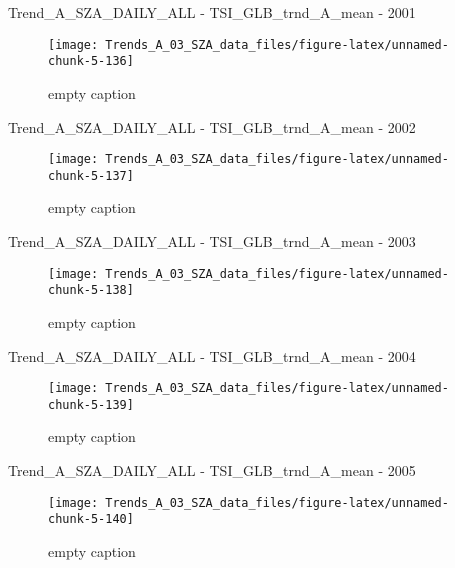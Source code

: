 \documentclass[
  10pt,
  a4paper,oneside]{article}
\begin{document}
Trend\_A\_SZA\_DAILY\_ALL - TSI\_GLB\_trnd\_A\_mean - 2001

\begin{figure}[!ht]

{\centering \texttt{[image: Trends\_A\_03\_SZA\_data\_files/figure-latex/unnamed-chunk-5-136]} 

}

\caption{ empty caption }\label{fig:unnamed-chunk-5-136}
\end{figure}

Trend\_A\_SZA\_DAILY\_ALL - TSI\_GLB\_trnd\_A\_mean - 2002

\begin{figure}[!ht]

{\centering \texttt{[image: Trends\_A\_03\_SZA\_data\_files/figure-latex/unnamed-chunk-5-137]} 

}

\caption{ empty caption }\label{fig:unnamed-chunk-5-137}
\end{figure}

Trend\_A\_SZA\_DAILY\_ALL - TSI\_GLB\_trnd\_A\_mean - 2003

\begin{figure}[!ht]

{\centering \texttt{[image: Trends\_A\_03\_SZA\_data\_files/figure-latex/unnamed-chunk-5-138]} 

}

\caption{ empty caption }\label{fig:unnamed-chunk-5-138}
\end{figure}

Trend\_A\_SZA\_DAILY\_ALL - TSI\_GLB\_trnd\_A\_mean - 2004

\begin{figure}[!ht]

{\centering \texttt{[image: Trends\_A\_03\_SZA\_data\_files/figure-latex/unnamed-chunk-5-139]} 

}

\caption{ empty caption }\label{fig:unnamed-chunk-5-139}
\end{figure}

Trend\_A\_SZA\_DAILY\_ALL - TSI\_GLB\_trnd\_A\_mean - 2005

\begin{figure}[!ht]

{\centering \texttt{[image: Trends\_A\_03\_SZA\_data\_files/figure-latex/unnamed-chunk-5-140]} 

}

\caption{ empty caption }\label{fig:unnamed-chunk-5-140}
\end{figure}
\end{document}
